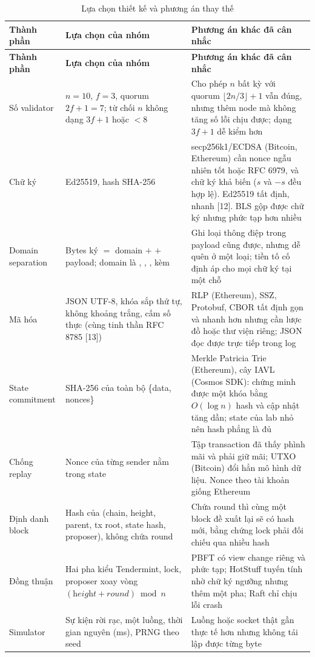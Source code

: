 \documentclass[a4paper,12pt]{article}
\newcommand{\code}[1]{\texttt{\detokenize{#1}}}
\newcommand{\tablefont}{\fontsize{10.5}{12.6}\selectfont}
\begin{document}
{\tablefont
\setlength{\LTpre}{2pt}\setlength{\LTpost}{2pt}
\begin{longtable}{@{}P{22mm} P{60mm} P{76mm}@{}}
\caption{Lựa chọn thiết kế và phương án thay thế}\label{tab:design}\\
\toprule
\textbf{Thành phần} & \textbf{Lựa chọn của nhóm} & \textbf{Phương án khác đã cân nhắc} \\ \midrule
\endfirsthead
\toprule
\textbf{Thành phần} & \textbf{Lựa chọn của nhóm} & \textbf{Phương án khác đã cân nhắc} \\ \midrule
\endhead
Số validator & $n = 10$, $f = 3$, quorum $2f+1 = 7$; từ chối $n$ không dạng $3f+1$ hoặc $< 8$ & Cho phép $n$ bất kỳ với quorum $\lfloor 2n/3 \rfloor + 1$ vẫn đúng, nhưng thêm node mà không tăng số lỗi chịu được; dạng $3f+1$ dễ kiểm hơn \\
Chữ ký & Ed25519, hash SHA-256 & secp256k1/ECDSA (Bitcoin, Ethereum) cần nonce ngẫu nhiên tốt hoặc RFC 6979, và chữ ký khả biến ($s$ và $-s$ đều hợp lệ). Ed25519 tất định, nhanh [12]. BLS gộp được chữ ký nhưng phức tạp hơn nhiều \\
Domain separation & Bytes ký $=$ domain $+$ \code{0x00} $+$ payload; domain là \code{TX:}, \code{HEADER:}, \code{VOTE:}, \code{PROPOSAL:} kèm \code{chain_id} & Ghi loại thông điệp trong payload cũng được, nhưng dễ quên ở một loại; tiền tố cố định áp cho mọi chữ ký tại một chỗ \\
Mã hóa & JSON UTF-8, khóa sắp thứ tự, không khoảng trắng, cấm số thực (cùng tinh thần RFC 8785 [13]) & RLP (Ethereum), SSZ, Protobuf, CBOR tất định gọn và nhanh hơn nhưng cần lược đồ hoặc thư viện riêng; JSON đọc được trực tiếp trong log \\
State commitment & SHA-256 của toàn bộ \{data, nonces\} & Merkle Patricia Trie (Ethereum), cây IAVL (Cosmos SDK): chứng minh được một khóa bằng $O(\log n)$ hash và cập nhật tăng dần; state của lab nhỏ nên hash phẳng là đủ \\
Chống replay & Nonce của từng sender nằm trong state & Tập transaction đã thấy phình mãi và phải giữ mãi; UTXO (Bitcoin) đổi hẳn mô hình dữ liệu. Nonce theo tài khoản giống Ethereum \\
Định danh block & Hash của (chain, height, parent, tx root, state hash, proposer), không chứa round & Chứa round thì cùng một block đề xuất lại sẽ có hash mới, bằng chứng lock phải đối chiếu qua nhiều hash \\
Đồng thuận & Hai pha kiểu Tendermint, lock, proposer xoay vòng $(\textit{height}+\textit{round}) \bmod n$ & PBFT có view change riêng và phức tạp; HotStuff tuyến tính nhờ chữ ký ngưỡng nhưng thêm một pha; Raft chỉ chịu lỗi crash \\
Simulator & Sự kiện rời rạc, một luồng, thời gian nguyên (ms), PRNG theo seed & Luồng hoặc socket thật gần thực tế hơn nhưng không tái lập được từng byte \\
\bottomrule
\end{longtable}}
\end{document}
